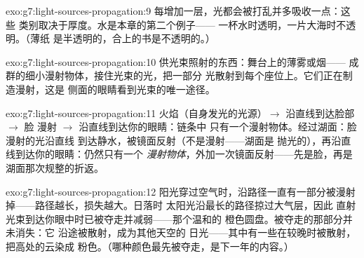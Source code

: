 \begin{solution}{exo:g7:light-sources-propagation:9}
每增加一层，光都会被打乱并多吸收一点：这些
类别取决于厚度。水是本章的第二个例子——
一杯水时透明，一片大海时不透明。（薄纸
是半透明的，合上的书是不透明的。）
\end{solution}

\begin{solution}{exo:g7:light-sources-propagation:10}
供光束照射的东西：舞台上的薄雾或烟——
成群的细小漫射物体，接住光束的光，把一部分
光散射到每个座位上。它们正在制造漫射，这是
侧面的眼睛看到光束的唯一途径。
\end{solution}

\begin{solution}{exo:g7:light-sources-propagation:11}
火焰（自身发光的光源）$\to$ 沿直线到达脸部 $\to$ 脸
漫射 $\to$ 沿直线到达你的眼睛：链条中
只有一个漫射物体。经过湖面：脸漫射的光沿直线
到达静水，被镜面反射（不是漫射——湖面是
抛光的），再沿直线到达你的眼睛：仍然只有一个
\emph{漫射物体}，外加一次镜面反射——先是脸，再是
湖面那次规整的折返。
\end{solution}

\begin{solution}{exo:g7:light-sources-propagation:12}
阳光穿过空气时，沿路径一直有一部分被漫射
掉——路径越长，损失越大。日落时
太阳光沿最长的路径掠过大气层，因此
直射光束到达你眼中时已被夺走并减弱——那个温和的
橙色圆盘。被夺走的那部分并未消失：它
沿途被散射，成为其他天空的
日光——其中有一些在较晚时被散射，把高处的云染成
粉色。（哪种颜色最先被夺走，是下一年的内容。）
\end{solution}

